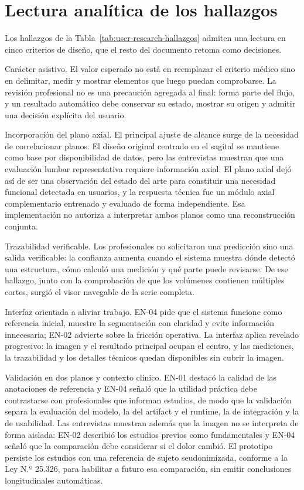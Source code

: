 \section{Lectura analítica de los hallazgos}

Los hallazgos de la Tabla~\ref{tab:user-research-hallazgos} admiten una lectura en cinco criterios de diseño, que el resto del documento retoma como decisiones.

Carácter asistivo. El valor esperado no está en reemplazar el criterio médico sino en delimitar, medir y mostrar elementos que luego puedan comprobarse. La revisión profesional no es una precaución agregada al final: forma parte del flujo, y un resultado automático debe conservar su estado, mostrar su origen y admitir una decisión explícita del usuario.

Incorporación del plano axial. El principal ajuste de alcance surge de la necesidad de correlacionar planos. El diseño original centrado en el sagital se mantiene como base por disponibilidad de datos, pero las entrevistas muestran que una evaluación lumbar representativa requiere información axial. El plano axial dejó así de ser una observación del estado del arte para constituir una necesidad funcional detectada en usuarios, y la respuesta técnica fue un módulo axial complementario entrenado y evaluado de forma independiente. Esa implementación no autoriza a interpretar ambos planos como una reconstrucción conjunta.

Trazabilidad verificable. Los profesionales no solicitaron una predicción sino una salida verificable: la confianza aumenta cuando el sistema muestra dónde detectó una estructura, cómo calculó una medición y qué parte puede revisarse. De ese hallazgo, junto con la comprobación de que los volúmenes contienen múltiples cortes, surgió el visor navegable de la serie completa.

Interfaz orientada a aliviar trabajo. EN-04 pide que el sistema funcione como referencia inicial, muestre la segmentación con claridad y evite información innecesaria; EN-02 advierte sobre la fricción operativa. La interfaz aplica revelado progresivo: la imagen y el resultado principal ocupan el centro, y las mediciones, la trazabilidad y los detalles técnicos quedan disponibles sin cubrir la imagen.

Validación en dos planos y contexto clínico. EN-01 destacó la calidad de las anotaciones de referencia y EN-04 señaló que la utilidad práctica debe contrastarse con profesionales que informan estudios, de modo que la validación separa la evaluación del modelo, la del artifact y el runtime, la de integración y la de usabilidad. Las entrevistas muestran además que la imagen no se interpreta de forma aislada: EN-02 describió los estudios previos como fundamentales y EN-04 señaló que la comparación debe considerar si el dolor cambió. El prototipo persiste los estudios con una referencia de sujeto seudonimizada, conforme a la Ley N.º 25.326, para habilitar a futuro esa comparación, sin emitir conclusiones longitudinales automáticas.

